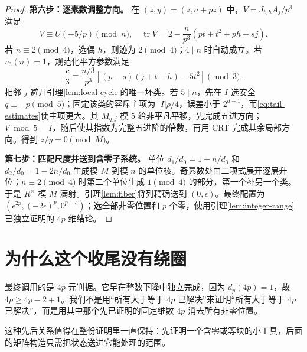 \begin{proof}
\par\noindent\textbf{第六步：逐素数调整方向。}
在 $(z,y)=(z,a+pz)$ 中，$V=J_{t,h}A_j/p^3$ 满足
\[
V\equiv U(-5/p)\pmod n,\quad
\operatorname{tr}V=2-\frac n{p^3}(pt+t^2+ph+sj).
\]
若 $n\equiv2\pmod4$，选偶 $h$，则迹为 $2\pmod4$；$4\mid n$ 时自动成立。若 $v_3(n)=1$，规范化平方参数满足
\[
\frac c3\equiv\frac{n/3}{p^3}[(p-s)(j+t-h)-5t^2]\pmod3.
\]
相邻 $j$ 避开引理\ref{lem:local-cycle}的唯一坏类。若 $5\mid n$，先在 $I$ 选安全 $q\equiv-p\pmod5$；固定该类的容斥主项为 $|I|\rho/4$，误差小于 $2^{d-1}$，而\eqref{eq:tail-estimates}使主项更大。其 $M_{q,j}$ 模 $5$ 给非平凡平移，先完成五进方向；$V\bmod5=I$，随后使其指数为完整五进阶的倍数，再用 CRT 完成其余局部方向。得到 $z/y=0\pmod M$。

\par\noindent\textbf{第七步：匹配尺度并送到含零子系统。}
单位 $d_1/d_0=1-n/d_0$ 和 $d_2/d_0=1-2n/d_0$ 生成模 $M$ 到模 $n$ 的单位核。奇素数处由二项式展开逐层升位；$n\equiv2\pmod4$ 时第二个单位生成 $1\pmod4$ 的部分，第一个补另一个类。于是 $R^\times$ 模 $M$ 满射。引理\ref{lem:fiber}将列精确送到 $(0,\epsilon)$。最终配置为 $(\epsilon^{2p},(-2\epsilon)^p,0^{p+s})$；选全部非零位置和 $p$ 个零，使用引理\ref{lem:integer-range}已独立证明的 $4p$ 维结论。
\end{proof}

\section{为什么这个收尾没有绕圈}
最终调用的是 $4p$ 元判据。它早在整数下降中独立完成，因为 $d_p(4p)=1$，故 $4p\ge4p-2+1$。我们不是用“所有大于等于 $4p$ 已解决”来证明“所有大于等于 $4p$ 已解决”，而是用其中那个先已证明的固定维数 $4p$ 消去所有非零位置。

这种先后关系值得在整份证明里一直保持：先证明一个含零或等块的小工具，后面的矩阵构造只需把状态送进它能处理的范围。
